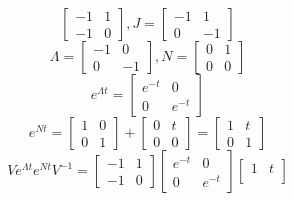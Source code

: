 \begin{enumerate}
\begin{equation}
\begin{bmatrix}
        -1 & 1 \\
        -1 & 0
      \end{bmatrix},
      J =
      \begin{bmatrix}
        -1 &  1 \\
         0 & -1
      \end{bmatrix}
    \end{equation}
    \begin{equation}
      \Lambda =
      \begin{bmatrix}
        -1 &  0 \\
         0 & -1
      \end{bmatrix},
      N =
      \begin{bmatrix}
        0 & 1 \\
        0 & 0
      \end{bmatrix}
    \end{equation}
    \begin{equation}
      e^{\Lambda t} =
      \begin{bmatrix}
        e^{-t} & 0 \\
        0 & e^{-t}
      \end{bmatrix}
    \end{equation}
    \begin{equation}
      e^{N t} =
      \begin{bmatrix}
        1 & 0 \\
        0 & 1
      \end{bmatrix} +
      \begin{bmatrix}
        0 & t \\
        0 & 0
      \end{bmatrix} =
      \begin{bmatrix}
        1 & t \\
        0 & 1
      \end{bmatrix}
    \end{equation}
    \begin{equation}
      Ve^{\Lambda t}e^{Nt}V^{-1} =
      \begin{bmatrix}
        -1 & 1 \\
        -1 & 0
      \end{bmatrix}
      \begin{bmatrix}
        e^{-t} & 0 \\
        0 & e^{-t}
      \end{bmatrix}
      \begin{bmatrix}
        1 & t \\

\end{bmatrix}
\end{equation}
\end{enumerate}
